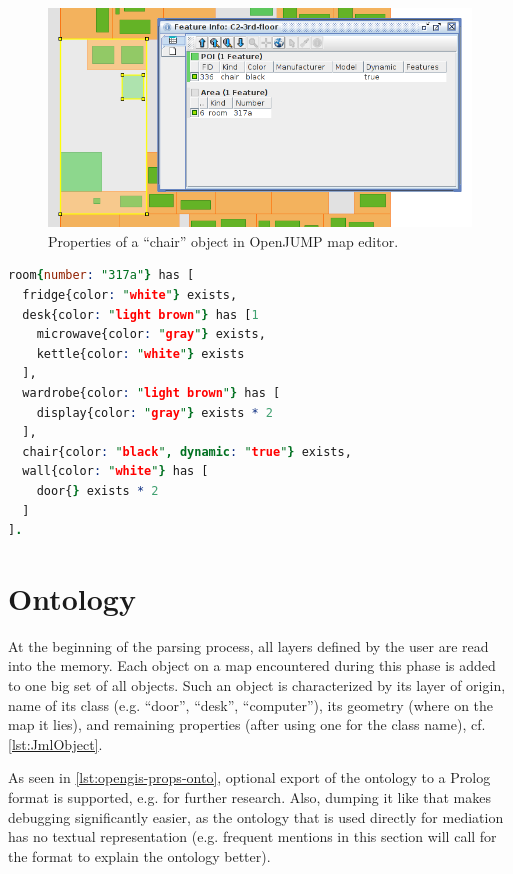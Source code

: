 \begin{figure}
	\centering
	\includegraphics[width=\textwidth]{opengis-props-map}
	\caption{Properties of a ``chair'' object in OpenJUMP map editor.}
	\label{fig:opengis-props-map}
\end{figure}

\begin{lstlisting}[language=Prolog,caption={Ontology exported to Prolog source code for room ``317a'' containing the ``chair'' from \cref{fig:opengis-props-map} at line 10.},label=lst:opengis-props-onto]
room{number: "317a"} has [
  fridge{color: "white"} exists,
  desk{color: "light brown"} has [1
    microwave{color: "gray"} exists,
    kettle{color: "white"} exists
  ],
  wardrobe{color: "light brown"} has [
    display{color: "gray"} exists * 2
  ],
  chair{color: "black", dynamic: "true"} exists,
  wall{color: "white"} has [
    door{} exists * 2
  ]
].
\end{lstlisting}

\section{Ontology}
\label{sec:ontology}

At the beginning of the parsing process, all layers defined by the user are read into the memory. Each object on a map encountered during this phase is added to one big set of all objects. Such an object is characterized by its layer of origin, name of its class (e.g. ``door'', ``desk'', ``computer''), its geometry (where on the map it lies), and remaining properties (after using one for the class name), cf. \cref{lst:JmlObject}.

As seen in \cref{lst:opengis-props-onto}, optional export of the ontology to a Prolog format is supported, e.g. for further research. Also, dumping it like that makes debugging significantly easier, as the ontology that is used directly for mediation has no textual representation (e.g. frequent mentions in this section will call for the format to explain the ontology better).

